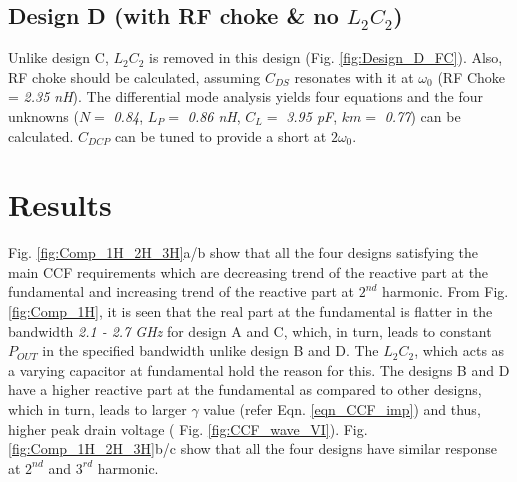 \documentclass[conference]{IEEEtran}
\begin{document}
\subsection{Design D (with RF choke \& no $L_2C_2$)}
 Unlike design C, $L_2C_2$ is removed in this design (Fig. \ref{fig:Design_D_FC}). Also, RF choke should be calculated, assuming $C_{DS}$ resonates with it at $\omega_0$ (RF Choke = \textit{2.35 nH}).
The differential mode analysis yields four equations and the four unknowns ($N =$ \textit{0.84}, $L_P =$ \textit{0.86 nH}, $C_L =$ \textit{3.95 pF}, $km =$ \textit{0.77}) can be calculated.
$C_{DCP}$ can be tuned to provide a short at $2\omega_0$.

\section{Results}
\label{section:Results}

Fig. \ref{fig:Comp_1H_2H_3H}a/b show that all the four designs satisfying the main CCF requirements which \color{blue} are \color{black} decreasing trend of the reactive part at \color{blue} the \color{black} fundamental and increasing trend of the reactive part at $2^{nd}$ harmonic.
From Fig. \ref{fig:Comp_1H}, it is seen that the real part at \color{blue} the \color{black} fundamental is flatter in the bandwidth \textit{2.1 - 2.7 GHz} for design A and C, which, in turn, leads to constant $P_{OUT}$ in the specified bandwidth unlike design B and D. The $L_2C_2$, which acts as a varying capacitor at fundamental hold the reason for this. The designs B and D have a higher reactive part at the fundamental as compared to other designs, which in turn, leads to larger $\gamma$ value (refer Eqn. \ref{eqn_CCF_imp}) and thus, higher \color{blue} peak drain voltage ( Fig. \ref{fig:CCF_wave_VI}). \color{black} Fig. \ref{fig:Comp_1H_2H_3H}b/c show that all the four designs have similar response at $2^{nd}$ and $3^{rd}$ harmonic. 
\end{document}
